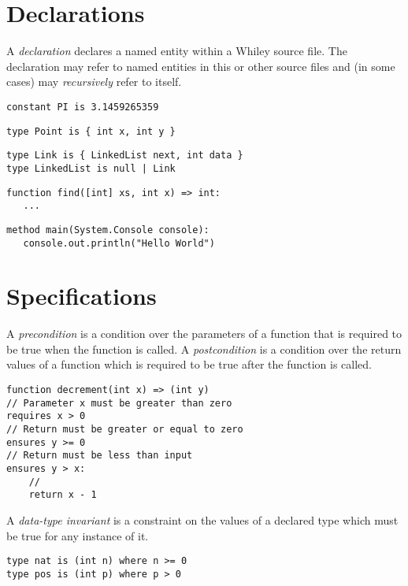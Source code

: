 \documentclass[a4paper,10pt,twcolumn]{article}
\begin{document}
\section*{Declarations}
A {\em declaration} declares a named entity within a Whiley source file.  The declaration may refer to named entities in this or other source files and (in some cases) may {\em recursively} refer to itself.

\begin{lstlisting}
constant PI is 3.1459265359
\end{lstlisting}

\begin{lstlisting}
type Point is { int x, int y }
\end{lstlisting}

\begin{lstlisting}
type Link is { LinkedList next, int data }
type LinkedList is null | Link
\end{lstlisting}

\begin{lstlisting}
function find([int] xs, int x) => int:
   ...
\end{lstlisting}

\begin{lstlisting}
method main(System.Console console):
   console.out.println("Hello World")
\end{lstlisting}

\section*{Specifications}

A {\em precondition} is a condition over the parameters of a function
that is required to be true when the function is called.  A {\em
  postcondition} is a condition over the return values of a function
which is required to be true after the function is called.

\begin{lstlisting}
function decrement(int x) => (int y) 
// Parameter x must be greater than zero
requires x > 0
// Return must be greater or equal to zero
ensures y >= 0
// Return must be less than input
ensures y > x:
    //
    return x - 1
\end{lstlisting}

A {\em data-type invariant} is a constraint on the values of a
declared type which must be true for any instance of it.

\begin{lstlisting}
type nat is (int n) where n >= 0
type pos is (int p) where p > 0
\end{lstlisting}
\end{document}
